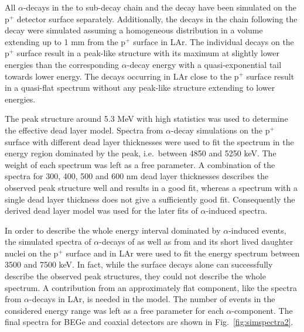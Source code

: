 All $\alpha$-decays in the  to  sub-decay chain and the  decay have been simulated on the p$^+$ detector surface separately. Additionally, the decays in the chain following the  decay were simulated assuming a homogeneous distribution in a volume extending up to 1 mm from the p$^+$ surface in LAr. The individual decays on the p$^+$ surface result in a peak-like structure with its maximum at slightly lower energies than the corresponding $\alpha$-decay energy with a quasi-exponential tail towards lower energy. The decays occurring in LAr close to the p$^+$ surface result in a quasi-flat spectrum without any peak-like structure extending to lower energies.

The  peak structure around 5.3 MeV with high statistics was used to determine the effective dead layer model. Spectra from  $\alpha$-decay simulations on the p$^+$ surface with different dead layer thicknesses were used to fit the spectrum in the energy region dominated by the  peak, i.e.~between 4850 and 5250 keV. The weight of each spectrum was left as a free parameter. A combination of the spectra for 300, 400, 500 and 600 nm dead layer thicknesses describes the observed peak structure well and results in a good fit, whereas a spectrum with a single dead layer thickness does not give a sufficiently good fit. Consequently the derived dead layer model was used for the later fits of $\alpha$-induced spectra.

In order to describe the whole energy interval dominated by $\alpha$-induced events, the simulated spectra of $\alpha$-decays of  as well as from  and its short lived daughter nuclei on the p$^+$ surface and in LAr were used to fit the energy spectrum between 3500 and 7500 keV. In fact, while the surface decays alone can successfully describe the observed peak structures, they could not describe the whole spectrum. A contribution from an approximately flat component, like the spectra from $\alpha$-decays in LAr, is needed in the model. The number of events in the considered energy range was left as a free parameter for each $\alpha$-component. The final spectra for BEGe and coaxial detectors are shown in Fig.~\ref{fig:simspectra2}.

